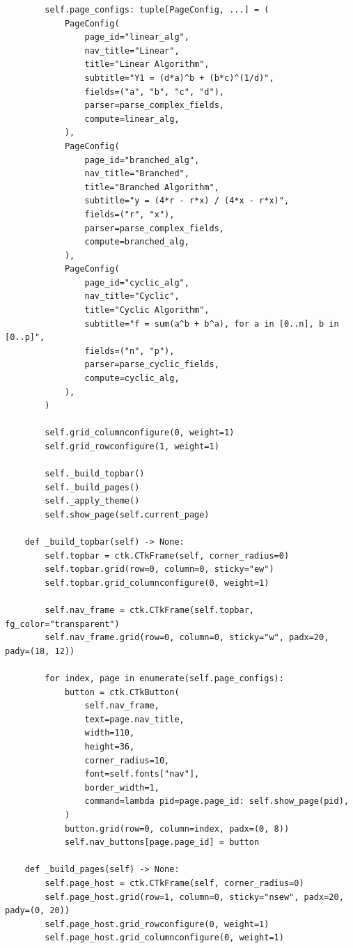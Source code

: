 \documentclass[12pt,a4paper]{article}
\begin{document}
\begin{verbatim}
        self.page_configs: tuple[PageConfig, ...] = (
            PageConfig(
                page_id="linear_alg",
                nav_title="Linear",
                title="Linear Algorithm",
                subtitle="Y1 = (d*a)^b + (b*c)^(1/d)",
                fields=("a", "b", "c", "d"),
                parser=parse_complex_fields,
                compute=linear_alg,
            ),
            PageConfig(
                page_id="branched_alg",
                nav_title="Branched",
                title="Branched Algorithm",
                subtitle="y = (4*r - r*x) / (4*x - r*x)",
                fields=("r", "x"),
                parser=parse_complex_fields,
                compute=branched_alg,
            ),
            PageConfig(
                page_id="cyclic_alg",
                nav_title="Cyclic",
                title="Cyclic Algorithm",
                subtitle="f = sum(a^b + b^a), for a in [0..n], b in [0..p]",
                fields=("n", "p"),
                parser=parse_cyclic_fields,
                compute=cyclic_alg,
            ),
        )

        self.grid_columnconfigure(0, weight=1)
        self.grid_rowconfigure(1, weight=1)

        self._build_topbar()
        self._build_pages()
        self._apply_theme()
        self.show_page(self.current_page)

    def _build_topbar(self) -> None:
        self.topbar = ctk.CTkFrame(self, corner_radius=0)
        self.topbar.grid(row=0, column=0, sticky="ew")
        self.topbar.grid_columnconfigure(0, weight=1)

        self.nav_frame = ctk.CTkFrame(self.topbar, fg_color="transparent")
        self.nav_frame.grid(row=0, column=0, sticky="w", padx=20, pady=(18, 12))

        for index, page in enumerate(self.page_configs):
            button = ctk.CTkButton(
                self.nav_frame,
                text=page.nav_title,
                width=110,
                height=36,
                corner_radius=10,
                font=self.fonts["nav"],
                border_width=1,
                command=lambda pid=page.page_id: self.show_page(pid),
            )
            button.grid(row=0, column=index, padx=(0, 8))
            self.nav_buttons[page.page_id] = button

    def _build_pages(self) -> None:
        self.page_host = ctk.CTkFrame(self, corner_radius=0)
        self.page_host.grid(row=1, column=0, sticky="nsew", padx=20, pady=(0, 20))
        self.page_host.grid_rowconfigure(0, weight=1)
        self.page_host.grid_columnconfigure(0, weight=1)


\end{verbatim}
\end{document}
